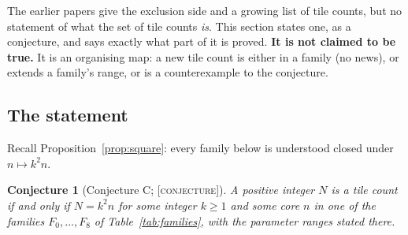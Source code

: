 \documentclass[11pt,reqno]{amsart}
\theoremstyle{plain}
\newtheorem{conjecture}[theorem]{Conjecture}
\theoremstyle{definition}
\newcommand{\lab}[1]{\textup{[\textsc{#1}]}}
\newcommand{\CJ}{\lab{conjecture}}
\begin{document}
The earlier papers give the exclusion side and a growing list of tile counts, but no statement of what the set of tile counts \emph{is}.
This section states one, as a conjecture, and says exactly what part of it is proved.
\textbf{It is not claimed to be true.} It is an organising map: a new tile count is either in a family (no news), or extends a family's range, or is a counterexample to the conjecture.

\subsection{The statement}
Recall Proposition~\ref{prop:square}: every family below is understood closed under $n\mapsto k^2n$.
\begin{conjecture}[Conjecture C; \CJ{}]\label{conj:C}
A positive integer $N$ is a tile count if and only if $N=k^2n$ for some integer $k\ge1$ and some core $n$ in one of the families $F_0,\dots,F_8$ of Table~\ref{tab:families}, with the parameter ranges stated there.
\end{conjecture}
\end{document}
